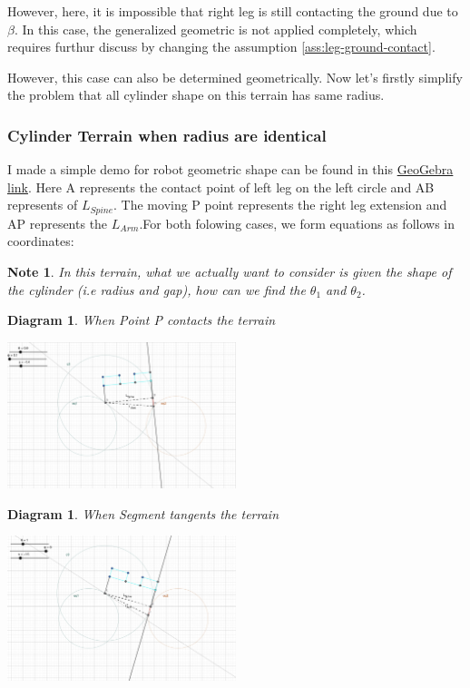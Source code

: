 \documentclass[11pt]{article}
\newtheorem{diagram}[statement]{Diagram}
\newtheorem{note}[statement]{Note}
\begin{document}
However, here, it is impossible that right leg is still contacting the ground due to \(\beta\). In this case, the generalized 
geometric is not applied completely, which requires furthur discuss by changing the assumption \ref{ass:leg-ground-contact}. 

However, this case can also be determined geometrically. Now let's firstly simplify the problem
that all cylinder shape on this terrain has same radius. 

\subsubsection*{Cylinder Terrain when radius are identical}

I made a simple demo for robot geometric shape can be found in this \href{https://www.geogebra.org/classic/vzgc97bq}{GeoGebra link}.
Here A represents the contact point of left leg on the left circle and AB represents of \(L_{Spine}\). The
moving P point represents the right leg extension and AP represents the \(L_{Arm}\).For both folowing cases, 
we form equations as follows in coordinates:

\begin{note}
    In this terrain, what we actually want to consider is given the shape of the cylinder
    (i.e radius and gap), how can we find the \(\theta_1\) and \(\theta_2\).
\end{note}

\begin{diagram}
    When Point P contacts the terrain
\end{diagram}
\vspace{1ex} %
\begin{center}
    \includegraphics[width=0.5\textwidth]{figs/Cylinder-Case1.jpg} %
\end{center}

\begin{diagram}
    When Segment tangents the terrain
\end{diagram}
\vspace{1ex} %
\begin{center}
    \includegraphics[width=0.5\textwidth]{figs/Cylinder-Case2.jpg} %
\end{center}
\end{document}
